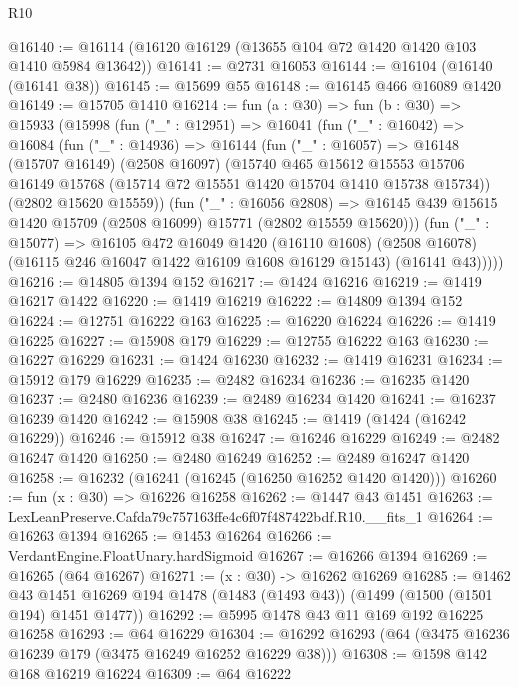 \begin{lexlean}{R10}
\begin{coremodule}
@16140 := @16114 (@16120 @16129 (@13655 @104 @72 @1420 @1420 @103 @1410 @5984 @13642))
@16141 := @2731 @16053
@16144 := @16104 (@16140 (@16141 @38))
@16145 := @15699 @55
@16148 := @16145 @466 @16089 @1420
@16149 := @15705 @1410
@16214 := fun (a : @30) =>
  fun (b : @30) =>
  @15933
    (@15998
      (fun ("_" : @12951) =>
      @16041
        (fun ("_" : @16042) =>
        @16084
          (fun ("_" : @14936) =>
          @16144
            (fun ("_" : @16057) =>
            @16148
              (@15707 @16149)
              (@2508 @16097)
              (@15740
                @465
                @15612
                @15553
                @15706
                @16149
                @15768
                (@15714 @72 @15551 @1420 @15704 @1410 @15738 @15734))
              (@2802 @15620 @15559))
            (fun ("_" : @16056 @2808) =>
            @16145 @439 @15615 @1420 @15709 (@2508 @16099) @15771 (@2802 @15559 @15620)))
          (fun ("_" : @15077) =>
          @16105
            @472
            @16049
            @1420
            (@16110 @1608)
            (@2508 @16078)
            (@16115 @246 @16047 @1422 @16109 @1608 @16129 @15143)
            (@16141 @43)))))
@16216 := @14805 @1394 @152
@16217 := @1424 @16216
@16219 := @1419 @16217 @1422
@16220 := @1419 @16219
@16222 := @14809 @1394 @152
@16224 := @12751 @16222 @163
@16225 := @16220 @16224
@16226 := @1419 @16225
@16227 := @15908 @179
@16229 := @12755 @16222 @163
@16230 := @16227 @16229
@16231 := @1424 @16230
@16232 := @1419 @16231
@16234 := @15912 @179 @16229
@16235 := @2482 @16234
@16236 := @16235 @1420
@16237 := @2480 @16236
@16239 := @2489 @16234 @1420
@16241 := @16237 @16239 @1420
@16242 := @15908 @38
@16245 := @1419 (@1424 (@16242 @16229))
@16246 := @15912 @38
@16247 := @16246 @16229
@16249 := @2482 @16247 @1420
@16250 := @2480 @16249
@16252 := @2489 @16247 @1420
@16258 := @16232 (@16241 (@16245 (@16250 @16252 @1420 @1420)))
@16260 := fun (x : @30) => @16226 @16258
@16262 := @1447 @43 @1451
@16263 := LexLeanPreserve.Cafda79c757163ffe4c6f07f487422bdf.R10.__fits_1
@16264 := @16263 @1394
@16265 := @1453 @16264
@16266 := VerdantEngine.FloatUnary.hardSigmoid
@16267 := @16266 @1394
@16269 := @16265 (@64 @16267)
@16271 := (x : @30) -> @16262 @16269
@16285 := @1462
    @43
    @1451
    @16269
    @194
    @1478
    (@1483 (@1493 @43))
    (@1499 (@1500 (@1501 @194) @1451 @1477))
@16292 := @5995 @1478 @43 @11 @169 @192 @16225 @16258
@16293 := @64 @16229
@16304 := @16292 @16293 (@64 (@3475 @16236 @16239 @179 (@3475 @16249 @16252 @16229 @38)))
@16308 := @1598 @142 @168 @16219 @16224
@16309 := @64 @16222

\end{coremodule}
\end{lexlean}
